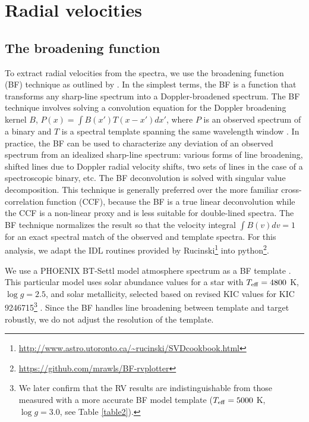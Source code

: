 \section{Radial velocities}\label{rvs}
\subsection{The broadening function}\label{bf}
To extract radial velocities from the spectra, we use the broadening function (BF) technique as outlined by \citet{ruc02}. In the simplest terms, the BF is a function that transforms any sharp-line spectrum into a Doppler-broadened spectrum. The BF technique involves solving a convolution equation for the Doppler broadening kernel $B$, $P(x) = \int B(x') T(x - x') dx'$, where $P$ is an observed spectrum of a binary and $T$ is a spectral template spanning the same wavelength window \citep{ruc15}. In practice, the BF can be used to characterize any deviation of an observed spectrum from an idealized sharp-line spectrum: various forms of line broadening, shifted lines due to Doppler radial velocity shifts, two sets of lines in the case of a spectroscopic binary, etc. The BF deconvolution is solved with singular value decomposition. This technique is generally preferred over the more familiar cross-correlation function (CCF), because the BF is a true linear deconvolution while the CCF is a non-linear proxy and is less suitable for double-lined spectra. The BF technique normalizes the result so that the velocity integral $\int B(v) dv = 1$ for an exact spectral match of the observed and template spectra. For this analysis, we adapt the IDL routines provided by Rucinski\footnote{\url{http://www.astro.utoronto.ca/\~rucinski/SVDcookbook.html}} into python\footnote{\url{https://github.com/mrawls/BF-rvplotter}}.

We use a PHOENIX BT-Settl model atmosphere spectrum as a BF template \citep{all03}. This particular model uses \citet{asp09} solar abundance values for a star with $T_{\rm{eff}} = 4800$ K, $\log g = 2.5$, and solar metallicity, selected based on revised KIC values for KIC 9246715\footnote{We later confirm that the RV results are indistinguishable from those measured with a more accurate BF model template ($T_{\rm{eff}} = 5000$ K, $\log g = 3.0$, see Table \ref{table2}).} \citep{hub14.2}. Since the BF handles line broadening between template and target robustly, we do not adjust the resolution of the template.

